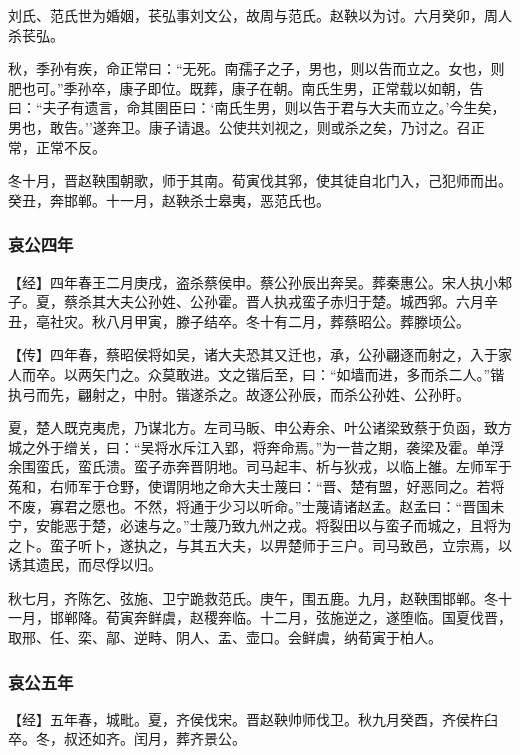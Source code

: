 \documentclass[]{article}
\begin{document}
刘氏、范氏世为婚姻，苌弘事刘文公，故周与范氏。赵鞅以为讨。六月癸卯，周人杀苌弘。

秋，季孙有疾，命正常曰：``无死。南孺子之子，男也，则以告而立之。女也，则肥也可。''季孙卒，康子即位。既葬，康子在朝。南氏生男，正常载以如朝，告曰：``夫子有遗言，命其圉臣曰：`南氏生男，则以告于君与大夫而立之。'今生矣，男也，敢告。''遂奔卫。康子请退。公使共刘视之，则或杀之矣，乃讨之。召正常，正常不反。

冬十月，晋赵鞅围朝歌，师于其南。荀寅伐其郛，使其徒自北门入，己犯师而出。癸丑，奔邯郸。十一月，赵鞅杀士皋夷，恶范氏也。

\hypertarget{header-n3078}{%
\subsubsection{哀公四年}\label{header-n3078}}

【经】四年春王二月庚戌，盗杀蔡侯申。蔡公孙辰出奔吴。葬秦惠公。宋人执小邾子。夏，蔡杀其大夫公孙姓、公孙霍。晋人执戎蛮子赤归于楚。城西郛。六月辛丑，亳社灾。秋八月甲寅，滕子结卒。冬十有二月，葬蔡昭公。葬滕顷公。

【传】四年春，蔡昭侯将如吴，诸大夫恐其又迁也，承，公孙翩逐而射之，入于家人而卒。以两矢门之。众莫敢进。文之锴后至，曰：``如墙而进，多而杀二人。''锴执弓而先，翩射之，中肘。锴遂杀之。故逐公孙辰，而杀公孙姓、公孙盱。

夏，楚人既克夷虎，乃谋北方。左司马眅、申公寿余、叶公诸梁致蔡于负函，致方城之外于缯关，曰：``吴将水斥江入郢，将奔命焉。''为一昔之期，袭梁及霍。单浮余围蛮氏，蛮氏溃。蛮子赤奔晋阴地。司马起丰、析与狄戎，以临上雒。左师军于菟和，右师军于仓野，使谓阴地之命大夫士蔑曰：``晋、楚有盟，好恶同之。若将不废，寡君之愿也。不然，将通于少习以听命。''士蔑请诸赵孟。赵孟曰：``晋国未宁，安能恶于楚，必速与之。''士蔑乃致九州之戎。将裂田以与蛮子而城之，且将为之卜。蛮子听卜，遂执之，与其五大夫，以畀楚师于三户。司马致邑，立宗焉，以诱其遗民，而尽俘以归。

秋七月，齐陈乞、弦施、卫宁跪救范氏。庚午，围五鹿。九月，赵鞅围邯郸。冬十一月，邯郸降。荀寅奔鲜虞，赵稷奔临。十二月，弦施逆之，遂堕临。国夏伐晋，取邢、任、栾、鄗、逆畤、阴人、盂、壶口。会鲜虞，纳荀寅于柏人。

\hypertarget{header-n3086}{%
\subsubsection{哀公五年}\label{header-n3086}}

【经】五年春，城毗。夏，齐侯伐宋。晋赵鞅帅师伐卫。秋九月癸酉，齐侯杵臼卒。冬，叔还如齐。闰月，葬齐景公。
\end{document}
